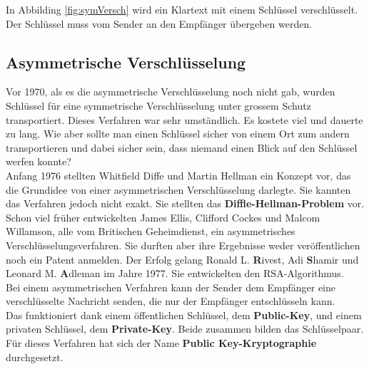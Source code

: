 In Abbilding \ref{fig:symVersch} wird ein Klartext mit einem Schlüssel verschlüsselt. Der Schlüssel muss vom Sender an den Empfänger übergeben werden. 
%
\subsection{Asymmetrische Verschlüsselung}
Vor 1970, als es die asymmetrische Verschlüsselung noch nicht gab, wurden Schlüssel für eine symmetrische Verschlüsselung unter grossem Schutz transportiert.
%
Dieses Verfahren war sehr umständlich. Es kostete viel und dauerte zu lang. Wie aber sollte man einen Schlüssel sicher von einem Ort zum andern transportieren und dabei sicher sein, dass niemand einen Blick auf den Schlüssel werfen konnte?\\
%
Anfang 1976 stellten Whitfield Diffe und Martin Hellman ein Konzept vor, das die Grundidee von einer asymmetrischen Verschlüsselung darlegte. Sie kannten das Verfahren jedoch nicht exakt. Sie stellten das \textbf{Diffle-Hellman-Problem} vor. \cite{rsa_and_public_key}\\ %
Schon viel früher entwickelten James Ellis, Clifford Cockes und Malcom Willamson, alle vom Britischen Geheimdienst, ein asymmetrisches Verschlüsselungsverfahren. Sie durften aber ihre Ergebnisse weder veröffentlichen noch ein Patent anmelden. 
Der Erfolg gelang Ronald L. \textbf{R}ivest, Adi \textbf{S}hamir und Leonard M. \textbf{A}dleman im Jahre 1977. Sie entwickelten den RSA-Algorithmus.\\[2ex]
%
Bei einem asymmetrischen Verfahren kann der Sender dem Empfänger eine verschlüsselte Nachricht senden, die nur der Empfänger entschlüsseln kann.\\
%
Das funktioniert dank einem öffentlichen Schlüssel, dem \textbf{Public-Key}, und einem privaten Schlüssel, dem \textbf{Private-Key}. Beide zusammen bilden das Schlüsselpaar.\\
Für dieses Verfahren hat sich der Name \textbf{Public Key-Kryptographie} durchgesetzt.
%
